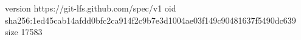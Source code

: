 version https://git-lfs.github.com/spec/v1
oid sha256:1ed45cab14afdd0bfc2ca914f2c9b7e3d1004ae03f149c90481637f5490dc639
size 17583
